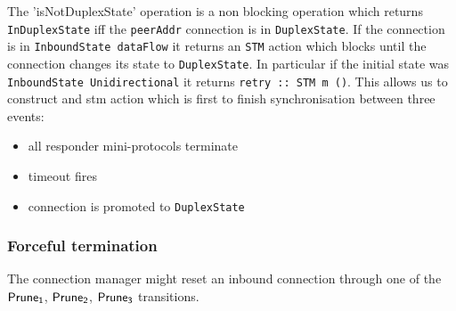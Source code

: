 \documentclass{article}
\def\DuplexState{\texttt{DuplexState}}
\def\InboundStateUni{\texttt{InboundState Unidirectional}}
\def\PruneA{$\text{\textsf{Prune}}_\text{\textsf{1}}$}
\def\PruneB{$\text{\textsf{Prune}}_\text{\textsf{2}}$}
\def\PruneC{$\text{\textsf{Prune}}_\text{\textsf{3}}$}
\begin{document}
The 'isNotDuplexState' operation is a non blocking operation which returns
\texttt{InDuplexState} iff the \texttt{peerAddr} connection is in \DuplexState{}.
If the connection is in \texttt{InboundState dataFlow} it returns an
\texttt{STM} action which blocks until the connection changes its state to
\DuplexState{}.  In particular if the initial state was
\InboundStateUni{} it returns \texttt{retry :: STM m ()}.
This allows us to construct and stm action which is first to finish
synchronisation between three events:
\begin{itemize}
  \item all responder mini-protocols terminate
  \item timeout fires
  \item connection is promoted to \DuplexState{}
\end{itemize}

\subsubsection{Forceful termination}
The connection manager might reset an inbound connection through one of the
\PruneA{}, \PruneB{}, \PruneC{} transitions.




\end{document}
